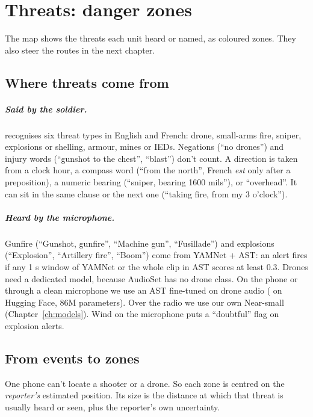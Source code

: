 \chapter{Threats: danger zones}\label{ch:danger}

The map shows the threats each unit heard or named, as coloured zones. They also steer the routes in the next
chapter.

\section{Where threats come from}

\paragraph{Said by the soldier.}  recognises six threat types in English and French: drone,
small-arms fire, sniper, explosions or shelling, armour, mines or IEDs. Negations (``no drones'') and injury
words (``gunshot to the chest'', ``blast'') don't count. A direction is taken from a clock hour, a compass word
(``from the north'', French \emph{est} only after a preposition), a numeric bearing (``sniper, bearing 1600
mils''), or ``overhead''. It can sit in the same clause or the next one (``taking fire, from my 3 o'clock'').

\paragraph{Heard by the microphone.} Gunfire (``Gunshot, gunfire'', ``Machine gun'', ``Fusillade'') and explosions
(``Explosion'', ``Artillery fire'', ``Boom'') come from YAMNet + AST: an alert fires if any 1 s window of YAMNet or
the whole clip in AST scores at least 0.3. Drones need a dedicated model, because AudioSet has no drone class. On
the phone or through a clean microphone we use an AST fine-tuned on drone audio ( on Hugging Face,
86M parameters). Over the radio we use our own Near-small (Chapter~\ref{ch:models}). Wind on the microphone puts a
``doubtful'' flag on explosion alerts.

\section{From events to zones}

One phone can't locate a shooter or a drone. So each zone is centred on the \emph{reporter's} estimated position.
Its size is the distance at which that threat is usually heard or seen, plus the reporter's own uncertainty.


